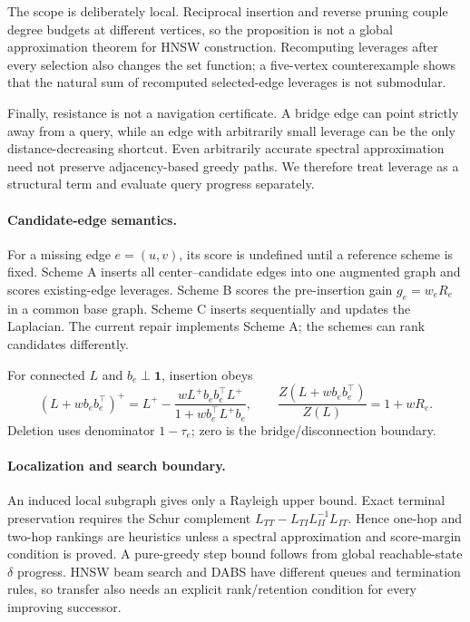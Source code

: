 The scope is deliberately local. Reciprocal insertion and reverse pruning
couple degree budgets at different vertices, so the proposition is not a
global approximation theorem for HNSW construction. Recomputing leverages
after every selection also changes the set function; a five-vertex
counterexample shows that the natural sum of recomputed selected-edge
leverages is not submodular.

Finally, resistance is not a navigation certificate. A bridge edge can point
strictly away from a query, while an edge with arbitrarily small leverage can
be the only distance-decreasing shortcut. Even arbitrarily accurate spectral
approximation need not preserve adjacency-based greedy paths. We therefore
treat leverage as a structural term and evaluate query progress separately.

\paragraph{Candidate-edge semantics.}
For a missing edge $e=(u,v)$, its score is undefined until a reference scheme is
fixed. Scheme A inserts all center--candidate edges into one augmented graph and
scores existing-edge leverages. Scheme B scores the pre-insertion gain
$g_e=w_eR_e$ in a common base graph. Scheme C inserts sequentially and updates
the Laplacian. The current repair implements Scheme A; the schemes can rank
candidates differently.

For connected $L$ and $b_e\perp\mathbf1$, insertion obeys
\begin{equation}
(L+w b_eb_e^\top)^+=L^+-
\frac{wL^+b_eb_e^\top L^+}{1+w b_e^\top L^+b_e},
\qquad \frac{Z(L+w b_eb_e^\top)}{Z(L)}=1+wR_e.
\end{equation}
Deletion uses denominator $1-\tau_e$; zero is the bridge/disconnection boundary.

\paragraph{Localization and search boundary.}
An induced local subgraph gives only a Rayleigh upper bound. Exact terminal
preservation requires the Schur complement
$L_{TT}-L_{TI}L_{II}^{-1}L_{IT}$. Hence one-hop and two-hop rankings are
heuristics unless a spectral approximation and score-margin condition is proved.
A pure-greedy step bound follows from global reachable-state $\delta$ progress.
HNSW beam search and DABS have different queues and termination rules, so transfer
also needs an explicit rank/retention condition for every improving successor.
